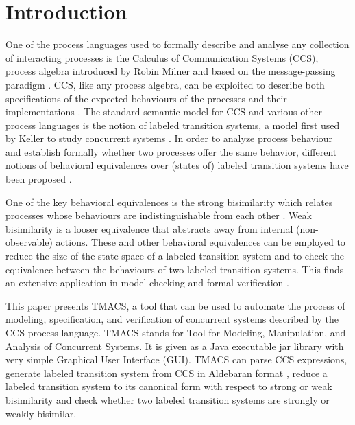\section{Introduction}


One of the process languages used to formally describe and analyse any collection of interacting processes is the Calculus of Communication Systems (CCS), process algebra introduced by Robin Milner and based on the message-passing paradigm \cite{Milner1}\cite{Milner2}. CCS, like any process algebra, can be exploited to describe both specifications of the expected behaviours of the processes and their implementations \cite{HandbookProcessAlgebra}. The standard semantic model for CCS and various other process languages is the notion of labeled transition systems, a model first used by Keller to study concurrent systems \cite{Keller}. In order to analyze process behaviour and establish formally whether two processes offer the same behavior, different notions of behavioral equivalences over (states of) labeled transition systems have been proposed \cite{ReactiveSystems}.

One of the key behavioral equivalences is the strong bisimilarity \cite{Park} which relates processes whose behaviours are indistinguishable from each other \cite{UnderstandingConcurrentSystems}. Weak bisimilarity \cite{Milner1}\cite{Milner3} is a looser equivalence that abstracts away from internal (non-observable) actions. These and other behavioral equivalences can be employed to reduce the size of the state space of a labeled transition system and to check the equivalence between the behaviours of two labeled transition systems. This finds an extensive application in model checking and formal verification \cite{ModelChecking}\cite{ReactiveSystems}.

This paper presents TMACS, a tool that can be used to automate the process of modeling, specification, and verification of concurrent systems described by the CCS process language. TMACS stands for Tool for Modeling, Manipulation, and Analysis of Concurrent Systems. It is given as a Java executable jar library with very simple Graphical User Interface (GUI). TMACS can parse CCS expressions, generate labeled transition system from CCS in Aldebaran format \cite{Aldebaran}, reduce a labeled transition system to its canonical form with respect to strong or weak bisimilarity and check whether two labeled transition systems are strongly or weakly bisimilar.

